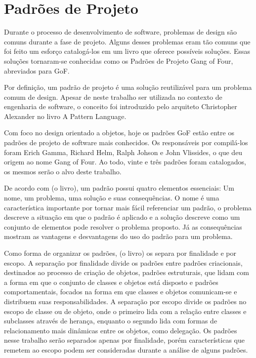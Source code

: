 \chapter{Padrões de Projeto}

Durante o processo de desenvolvimento de software, 
problemas de design são comuns durante a 
fase de projeto. Alguns desses problemas 
eram tão comuns que foi feito um esforço catalogá-los em 
um livro que oferece possíveis soluções. 
Essas soluções tornaram-se conhecidas como 
os Padrões de Projeto Gang of Four, abreviados 
para GoF.

Por definição, um padrão de projeto é uma solução 
reutilizável para um problema comum de design. Apesar 
de neste trabalho ser utilizada no contexto de engenharia 
de software, o conceito foi introduzido pelo arquiteto 
Christopher Alexander no livro A Pattern Language.

Com foco no design orientado a objetos, hoje os 
padrões GoF estão entre os padrões de 
projeto de software mais conhecidos. Os responsáveis 
por compilá-los foram Erich Gamma, Richard Helm, 
Ralph Johson e John Vlissides, o que deu origem ao 
nome Gang of Four. Ao todo, vinte e três 
padrões foram catalogados, os mesmos serão o alvo deste 
trabalho.

De acordo com (o livro), um padrão possui quatro elementos 
essenciais: Um nome, um problema, uma solução e suas 
consequências. O nome é uma característica importante 
por tornar mais fácil referenciar um padrão, o problema 
descreve a situação em que o padrão é aplicado e 
a solução descreve como um conjunto de elementos pode 
resolver o problema proposto. Já as consequências 
mostram as vantagens e desvantagens do uso do padrão 
para um problema.

Como forma de organizar os padrões, (o livro) os separa 
por finalidade e por escopo. A separação por finalidade 
divide os padrões entre padrões criacionais, 
destinados ao processo de criação de objetos, padrões 
estruturais, que lidam com a forma em que o conjunto de 
classes e objetos está disposto e padrões comportamentais, 
focados na forma em que classes e objetos comunicam-se 
e distribuem suas responsabilidades. A separação por 
escopo divide os padrões no escopo de classe ou de objeto, 
onde o primeiro lida com a relação entre classes e 
subclasses através de herança, enquanto o segundo lida 
com formas de relacionamento mais dinâmicas entre os 
objetos, como delegação. Os padrões nesse trabalho 
serão separados apenas por finalidade, porém 
características que remetem ao escopo 
podem ser consideradas durante a análise de alguns 
padrões.

